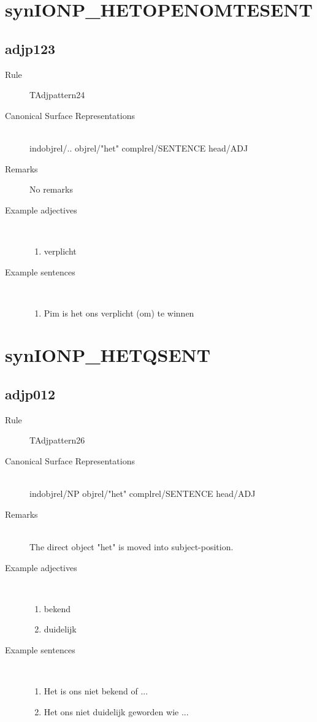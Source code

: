 \section{synIONP\_HETOPENOMTESENT}
\subsection{adjp123}
\begin{description}
  \item [Rule] TAdjpattern24
  \item [Canonical Surface Representations] \mbox{}\\  indobjrel/.. objrel/"het" 
complrel/SENTENCE head/ADJ
  \item [Remarks] No remarks

  \item [Example adjectives]\mbox{}\\
\begin{enumerate}
  \item verplicht
\end{enumerate}
  \item [Example sentences]\mbox{}\\
\begin{enumerate}
  \item Pim is het ons verplicht (om) te winnen
\end{enumerate}
\end{description}
\newpage
\section{synIONP\_HETQSENT}
  \subsection{adjp012}
\begin{description}
  \item [Rule] TAdjpattern26
  \item [Canonical Surface Representations] \mbox{}\\
indobjrel/NP  objrel/"het" complrel/SENTENCE head/ADJ
  \item [Remarks] \mbox{}\\
The direct object "het" is moved into subject-position.
  \item [Example adjectives]\mbox{}\\
\begin{enumerate}
  \item bekend
  \item duidelijk
\end{enumerate}
  \item [Example sentences]\mbox{}\\
\begin{enumerate}
  \item Het is ons niet bekend of ...
  \item Het ons niet duidelijk geworden wie ...
\end{enumerate}
\end{description}
\newpage
